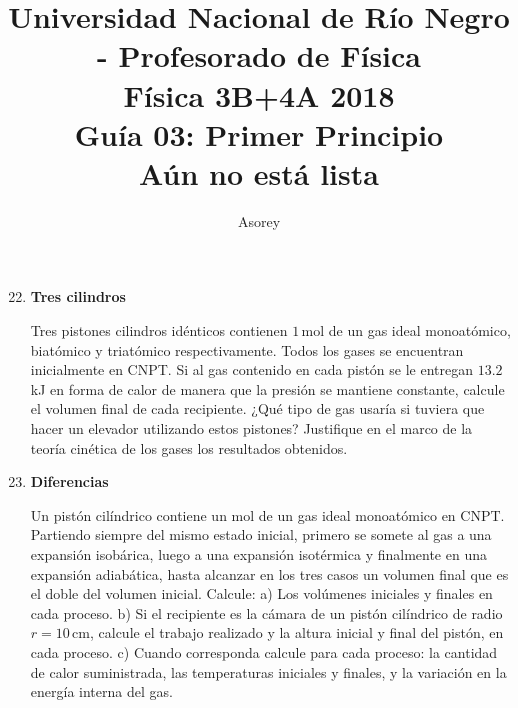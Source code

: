 \documentclass[a4paper,12pt]{article}
\begin{document}
\title{
{\normalsize{Universidad Nacional de Río Negro - Profesorado de Física}}\\
Física 3B+4A  2018 \\ Guía 03: Primer Principio \\ {\bf{Aún no está lista}}
}
\author{Asorey}
\maketitle

\begin{enumerate}
	\setcounter{enumi}{21}      %

    \item {\bf{Tres cilindros}}

        Tres pistones cilindros idénticos contienen $1$\,mol de un gas ideal 
        monoatómico, biatómico y triatómico respectivamente. Todos los gases se
        encuentran inicialmente en CNPT. Si al gas contenido en cada pistón se
        le entregan $13.2$\,kJ en forma de calor de manera que la presión se
        mantiene constante, calcule el volumen final de cada recipiente.
        ¿Qué tipo de gas usaría si tuviera que hacer un elevador utilizando 
        estos pistones? Justifique en el marco de la teoría cinética de los
        gases los resultados obtenidos.

	\item {\bf{Diferencias}}
		
		Un pistón cilíndrico contiene un mol de un gas ideal monoatómico en
		CNPT.  Partiendo siempre del mismo estado inicial, primero se somete al
		gas a una expansión isobárica, luego a una expansión isotérmica y
		finalmente en una expansión adiabática, hasta alcanzar en los tres
		casos un volumen final que es el doble del volumen inicial. Calcule: a)
		Los volúmenes iniciales y finales en cada proceso. b) Si el recipiente
		es la cámara de un pistón cilíndrico de radio $r=10$\,cm, calcule el
		trabajo realizado y la altura inicial y final del pistón, en cada
		proceso. c) Cuando corresponda calcule para cada proceso: la cantidad
		de calor suministrada, las temperaturas iniciales y finales, y la
		variación en la energía interna del gas.

\end{enumerate}
\end{document}
